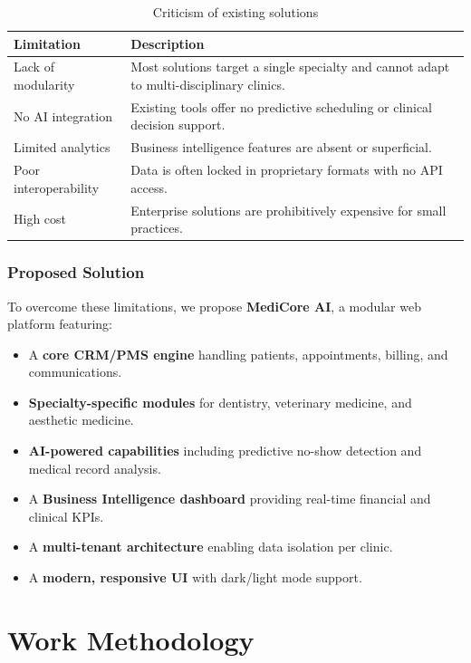 \documentclass[12pt,a4paper,oneside]{report}
\begin{document}
\begin{table}[H]
\centering
\caption{Criticism of existing solutions}
\label{tab:criticism}
\begin{tabular}{|p{4cm}|p{9cm}|}
\hline
\textbf{Limitation} & \textbf{Description} \\
\hline
Lack of modularity & Most solutions target a single specialty and cannot adapt to multi-disciplinary clinics. \\
\hline
No AI integration & Existing tools offer no predictive scheduling or clinical decision support. \\
\hline
Limited analytics & Business intelligence features are absent or superficial. \\
\hline
Poor interoperability & Data is often locked in proprietary formats with no API access. \\
\hline
High cost & Enterprise solutions are prohibitively expensive for small practices. \\
\hline
\end{tabular}
\end{table}

\subsubsection{Proposed Solution}
To overcome these limitations, we propose \textbf{MediCore AI}, a modular web platform featuring:

\begin{itemize}
    \item A \textbf{core CRM/PMS engine} handling patients, appointments, billing, and communications.
    \item \textbf{Specialty-specific modules} for dentistry, veterinary medicine, and aesthetic medicine.
    \item \textbf{AI-powered capabilities} including predictive no-show detection and medical record analysis.
    \item A \textbf{Business Intelligence dashboard} providing real-time financial and clinical KPIs.
    \item A \textbf{multi-tenant architecture} enabling data isolation per clinic.
    \item A \textbf{modern, responsive UI} with dark/light mode support.
\end{itemize}

\section{Work Methodology}
\end{document}
